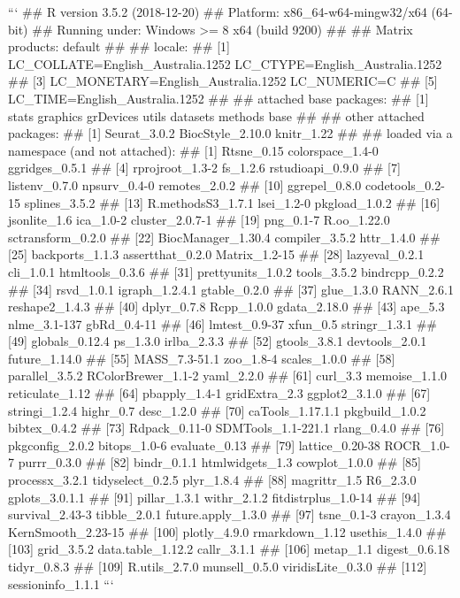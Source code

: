 ```
## R version 3.5.2 (2018-12-20)
## Platform: x86_64-w64-mingw32/x64 (64-bit)
## Running under: Windows >= 8 x64 (build 9200)
## 
## Matrix products: default
## 
## locale:
## [1] LC_COLLATE=English_Australia.1252  LC_CTYPE=English_Australia.1252   
## [3] LC_MONETARY=English_Australia.1252 LC_NUMERIC=C                      
## [5] LC_TIME=English_Australia.1252    
## 
## attached base packages:
## [1] stats     graphics  grDevices utils     datasets  methods   base     
## 
## other attached packages:
## [1] Seurat_3.0.2     BiocStyle_2.10.0 knitr_1.22      
## 
## loaded via a namespace (and not attached):
##   [1] Rtsne_0.15          colorspace_1.4-0    ggridges_0.5.1     
##   [4] rprojroot_1.3-2     fs_1.2.6            rstudioapi_0.9.0   
##   [7] listenv_0.7.0       npsurv_0.4-0        remotes_2.0.2      
##  [10] ggrepel_0.8.0       codetools_0.2-15    splines_3.5.2      
##  [13] R.methodsS3_1.7.1   lsei_1.2-0          pkgload_1.0.2      
##  [16] jsonlite_1.6        ica_1.0-2           cluster_2.0.7-1    
##  [19] png_0.1-7           R.oo_1.22.0         sctransform_0.2.0  
##  [22] BiocManager_1.30.4  compiler_3.5.2      httr_1.4.0         
##  [25] backports_1.1.3     assertthat_0.2.0    Matrix_1.2-15      
##  [28] lazyeval_0.2.1      cli_1.0.1           htmltools_0.3.6    
##  [31] prettyunits_1.0.2   tools_3.5.2         bindrcpp_0.2.2     
##  [34] rsvd_1.0.1          igraph_1.2.4.1      gtable_0.2.0       
##  [37] glue_1.3.0          RANN_2.6.1          reshape2_1.4.3     
##  [40] dplyr_0.7.8         Rcpp_1.0.0          gdata_2.18.0       
##  [43] ape_5.3             nlme_3.1-137        gbRd_0.4-11        
##  [46] lmtest_0.9-37       xfun_0.5            stringr_1.3.1      
##  [49] globals_0.12.4      ps_1.3.0            irlba_2.3.3        
##  [52] gtools_3.8.1        devtools_2.0.1      future_1.14.0      
##  [55] MASS_7.3-51.1       zoo_1.8-4           scales_1.0.0       
##  [58] parallel_3.5.2      RColorBrewer_1.1-2  yaml_2.2.0         
##  [61] curl_3.3            memoise_1.1.0       reticulate_1.12    
##  [64] pbapply_1.4-1       gridExtra_2.3       ggplot2_3.1.0      
##  [67] stringi_1.2.4       highr_0.7           desc_1.2.0         
##  [70] caTools_1.17.1.1    pkgbuild_1.0.2      bibtex_0.4.2       
##  [73] Rdpack_0.11-0       SDMTools_1.1-221.1  rlang_0.4.0        
##  [76] pkgconfig_2.0.2     bitops_1.0-6        evaluate_0.13      
##  [79] lattice_0.20-38     ROCR_1.0-7          purrr_0.3.0        
##  [82] bindr_0.1.1         htmlwidgets_1.3     cowplot_1.0.0      
##  [85] processx_3.2.1      tidyselect_0.2.5    plyr_1.8.4         
##  [88] magrittr_1.5        R6_2.3.0            gplots_3.0.1.1     
##  [91] pillar_1.3.1        withr_2.1.2         fitdistrplus_1.0-14
##  [94] survival_2.43-3     tibble_2.0.1        future.apply_1.3.0 
##  [97] tsne_0.1-3          crayon_1.3.4        KernSmooth_2.23-15 
## [100] plotly_4.9.0        rmarkdown_1.12      usethis_1.4.0      
## [103] grid_3.5.2          data.table_1.12.2   callr_3.1.1        
## [106] metap_1.1           digest_0.6.18       tidyr_0.8.3        
## [109] R.utils_2.7.0       munsell_0.5.0       viridisLite_0.3.0  
## [112] sessioninfo_1.1.1
```


